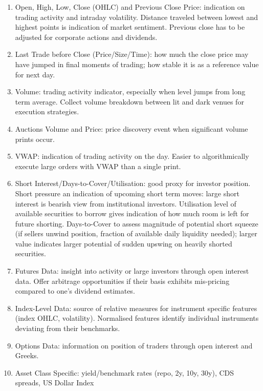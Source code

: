 \begin{definition} 
\begin{enumerate}[label=\roman*.]
\setlength{\itemsep}{0pt}
\item Open, High, Low, Close (OHLC) and Previous Close Price: indication on trading activity and intraday volatility. Distance traveled between lowest and highest points is indication of market sentiment. Previous close has to be adjusted for corporate actions and dividends.
\item Last Trade before Close (Price/Size/Time): how much the close price may have jumped in final moments of trading; how stable it is as a reference value for next day.
\item Volume: trading activity indicator, especially when level jumps from long term average. Collect volume breakdown between lit and dark venues for execution strategies.
\item Auctions Volume and Price: price discovery event when significant volume prints occur.
\item VWAP: indication of trading activity on the day. Easier to algorithmically execute large orders with VWAP than a single print.
\item Short Interest/Days-to-Cover/Utilisation: good proxy for investor position. Short pressure an indication of upcoming short term moves: large short interest is bearish view from institutional investors. Utilisation level of available securities to borrow gives indication of how much room is left for future shorting. Days-to-Cover to assess magnitude of potential short squeeze (if sellers unwind position, fraction of available daily liquidity needed); larger value indicates larger potential of sudden upswing on heavily shorted securities.
\item Futures Data: insight into activity or large investors through open interest data. Offer arbitrage opportunities if their basis exhibits mis-pricing compared to one's dividend estimates.
\item Index-Level Data: source of relative measures for instrument specific features (index OHLC, volatility). Normalised features identify individual instruments deviating from their benchmarks.
\item Options Data: information on position of traders through open interest and Greeks.
\item Asset Class Specific: yield/benchmark rates (repo, 2y, 10y, 30y), CDS spreads, US Dollar Index
\end{enumerate}
\end{definition}


